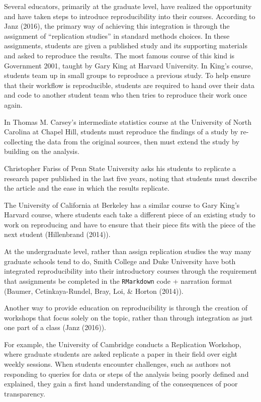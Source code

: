\documentclass[12pt,twoside]{reedthesis}
\begin{document}
Several educators, primarily at the graduate level, have realized the opportunity and have taken steps to introduce reproducibility into their courses.
According to Janz (2016), the primary way of achieving this integration is through the assignment of ``replication studies'' in standard methods choices. In these assignments, students are given a published study and its supporting materials and asked to reproduce the results. The most famous course of this kind is Government 2001, taught by Gary King at Harvard University. In King's course, students team up in small groups to reproduce a previous study. To help ensure that their workflow is reproducible, students are required to hand over their data and code to another student team who then tries to reproduce their work once again.

In Thomas M. Carsey's intermediate statistics course at the University of North Carolina at Chapel Hill, students must reproduce the findings of a study by re-collecting the data from the original sources, then must extend the study by building on the analysis.

Christopher Fariss of Penn State University asks his students to replicate a research paper published in the last five years, noting that students must describe the article and the ease in which the results replicate.

The University of California at Berkeley has a similar course to Gary King's Harvard course, where students each take a different piece of an existing study to work on reproducing and have to ensure that their piece fits with the piece of the next student (Hillenbrand (2014)).

At the undergraduate level, rather than assign replication studies the way many graduate schools tend to do, Smith College and Duke University have both integrated reproducibility into their introductory courses through the requirement that assignments be completed in the \texttt{RMarkdown} code + narration format (Baumer, Cetinkaya-Rundel, Bray, Loi, \& Horton (2014)).

Another way to provide education on reproducibility is through the creation of workshops that focus solely on the topic, rather than through integration as just one part of a class (Janz (2016)).

For example, the University of Cambridge conducts a Replication Workshop, where graduate students are asked replicate a paper in their field over eight weekly sessions. When students encounter challenges, such as authors not responding to queries for data or steps of the analysis being poorly defined and explained, they gain a first hand understanding of the consequences of poor transparency.
\end{document}

